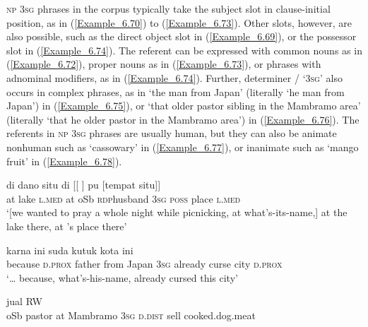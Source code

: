 \textsc{np} \textsc{3sg}  phrases in the corpus typically take the subject slot in clause-initial position, as in (\ref{Example_6.70}) to (\ref{Example_6.73}). Other slots, however, are also possible, such as the direct object slot in (\ref{Example_6.69}), or the possessor slot in (\ref{Example_6.74}). The referent can be expressed with common nouns as in (\ref{Example_6.72}), proper nouns as in (\ref{Example_6.73}), or  phrases with adnominal modifiers, as in (\ref{Example_6.74}). Further, determiner / ‘\textsc{3sg}’ also occurs in complex  phrases, as in  ‘the man from Japan’ (literally ‘he man from Japan’) in (\ref{Example_6.75}), or  ‘that older pastor sibling in the Mambramo area’ (literally ‘that he older pastor in the Mambramo area’) in (\ref{Example_6.76}). The referents in \textsc{np} \textsc{3sg}  phrases are usually human, but they can also be animate nonhuman such as  ‘cassowary’ in (\ref{Example_6.77}), or inanimate such as  ‘mango fruit’ in (\ref{Example_6.78}).


\ea
\label{Example_6.74}
\gll {\ldots} {di} {dano} {situ} {di} {[[} {} {]} {pu} {[tempat} {situ]]}\\ %
{ }   at  lake  \textsc{l.med}  at  oSb  \textsc{rdp}{\Tilde}husband  \textsc{3sg}  \textsc{poss}  place  \textsc{l.med}\\
\glt
‘[we wanted to pray a whole night while picnicking, at what’s-its-name,] at the lake there, at ’s place there’ \textstyleExampleSource{[080922-002-Cv.0090]}
\z

\ea
\label{Example_6.75}
\gll {\ldots} {{karna}} {ini} {} {} {} {} {suda} {kutuk}  {kota}  {ini}\\ %
 { }  {because}  \textsc{d.prox}  father  from  Japan  \textsc{3sg}  already  curse  {city}  {\textsc{d.prox}}\\
\glt
‘{\ldots} because, what’s-his-name,  already cursed this city’ \textstyleExampleSource{[080917-008-NP.0021]}
\z

\ea
\label{Example_6.76}
 {} {} {} {} {} {jual} {RW}\\ %
 oSb  pastor  at  Mambramo  \textsc{3sg}  \textsc{d.dist}  sell  cooked.dog.meat\\

